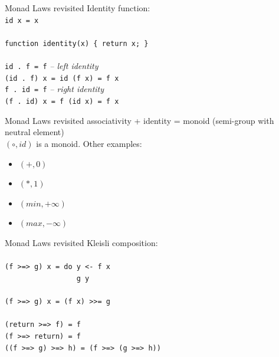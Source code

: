 \documentclass{beamer}
\begin{document}
\begin{frame}{Monad Laws revisited}
  Identity function: \\ \pause
  \texttt{id x = x} \\ \pause
  \ \\
  \texttt{function identity(x) \{ return x; \}} \\ \pause
  \ \\
  \texttt{id\ .\ f = f} \pause \textit{-- left identity} \\ \pause
  \texttt{(id\ .\ f) x \pause = id (f x) \pause = f x} \\ \pause
  \texttt{f\ .\ id = f} \pause \textit{-- right identity} \\ \pause
  \texttt{(f\ .\ id) x \pause = f (id x) \pause = f x}
\end{frame}

\begin{frame}{Monad Laws revisited}
  associativity + identity = monoid \pause (semi-group with neutral element) \\
  $(\circ, id)$ is a monoid. Other examples:\pause
  \begin{itemize}
  \item $(+, 0)$ \pause
  \item $(*, 1)$ \pause
  \item $(min, +\infty)$ \pause
  \item $(max, -\infty)$
  \end{itemize}
\end{frame}

\begin{frame}{Monad Laws revisited}
  Kleisli composition: \\ \pause
  \ \\
  \texttt{(f >=> g) x = do y <- f x \\
    \ \ \ \ \ \ \ \ \ \ \ \ \ \ \ \ \ g y} \\ \pause
  \ \\ 
  \texttt{(f >=> g) x = (f x) >>= g} \\ \pause
  \ \\
  \texttt{(return >=> f) = f} \\ \pause
  \texttt{(f >=> return) = f} \\ \pause
  \texttt{((f >=> g) >=> h) = (f >=> (g >=> h))}
\end{frame}
\end{document}
